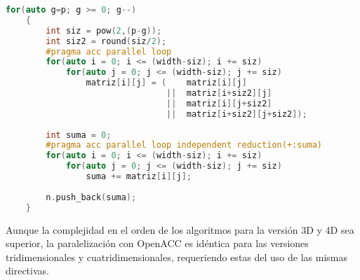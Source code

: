 \begin{lstlisting}[language=C++,caption={Primera versión del Boxcount2D paralelizado con OpenACC},label=ACCBox2D]
    for(auto g=p; g >= 0; g--)
    {
        int siz = pow(2,(p-g));
        int siz2 = round(siz/2);
        #pragma acc parallel loop 
        for(auto i = 0; i <= (width-siz); i += siz)
            for(auto j = 0; j <= (width-siz); j += siz)
                matriz[i][j] = (    matriz[i][j] 
                                ||  matriz[i+siz2][j] 
                                ||  matriz[i][j+siz2] 
                                ||  matriz[i+siz2][j+siz2]);
    
        int suma = 0; 
        #pragma acc parallel loop independent reduction(+:suma)
        for(auto i = 0; i <= (width-siz); i += siz)
            for(auto j = 0; j <= (width-siz); j += siz)
                suma += matriz[i][j];
    
        n.push_back(suma);
    }
\end{lstlisting}

Aunque la complejidad en el orden de los algoritmos para la versión 3D y 4D sea superior, la paralelización con OpenACC es idéntica para las versiones tridimensionales y cuatridimensionales, requeriendo estas del uso de las mismas directivas.